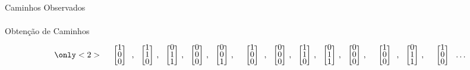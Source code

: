 \begin{frame}{Caminhos Observados}
\begin{align*}
       \end{align*}
\centering
\end{frame}
\begin{frame}{Obtenção de Caminhos}
  \setlength\arraycolsep{2pt}
 \small
 \begin{align*}
   {\only<2>{\color{blue}}\tikz[baseline]{
            \node[anchor=base] (n1)
            {\colvec{1\\0\\0}};
        }},\colvec{1\\1\\0}
        ,\colvec{0\\1\\1},\colvec{0\\0\\0},\colvec{0\\0\\1},\tikz[baseline]{
            \node[anchor=base] (n2)
            {\colvec{1\\0\\0}};
        },\colvec{0\\0\\0},\colvec{1\\1\\0},\colvec{0\\1\\1},\colvec{0\\0\\0},\tikz[baseline]{
            \node[anchor=base] (n3)
            {\colvec{1\\0\\0}};
        },\colvec{0\\1\\1},\tikz[baseline]{
            \node[anchor=base] (n4)
            {\colvec{1\\0\\0}};
        }\dots \\
\end{align*}
\end{frame}
